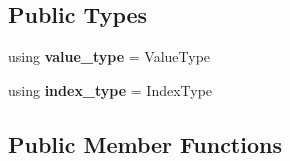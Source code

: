\subsection*{Public Types}
\begin{DoxyCompactItemize}
\item 
\mbox{\label{structgko_1_1matrix__data_a6c838616006189780b02eb05d0c60fa6}} 
using {\bfseries value\+\_\+type} = Value\+Type
\item 
\mbox{\label{structgko_1_1matrix__data_a60fc773e696c9295aff1d9f685a67712}} 
using {\bfseries index\+\_\+type} = Index\+Type
\end{DoxyCompactItemize}
\subsection*{Public Member Functions}
